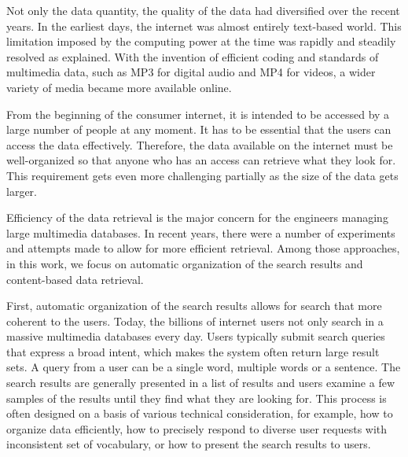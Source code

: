 Not only the data quantity, the quality of the data had diversified over the recent years. In the earliest days, the internet was almost entirely text-based world. This limitation imposed by the computing power at the time was rapidly and steadily resolved as explained. With the invention of efficient coding and standards of multimedia data, such as MP3 for digital audio and MP4 for videos, a wider variety of media became more available online.

From the beginning of the consumer internet, it is intended to be accessed by a large number of people at any moment. It has to be essential that the users can access the data effectively. Therefore, the data available on the internet must be well-organized so that anyone who has an access can retrieve what they look for. This requirement gets even more challenging partially as the size of the data gets larger.

Efficiency of the data retrieval is the major concern for the engineers managing large multimedia databases. In recent years, there were a number of experiments and attempts made to allow for more efficient retrieval. Among those approaches, in this work, we focus on automatic organization of the search results and content-based data retrieval.

First, automatic organization of the search results allows for search that more coherent to the users. Today, the billions of internet users not only search in a massive multimedia databases every day. 
Users typically submit search queries that express a broad intent, which makes the system often return large result sets. A query from a user can be a single word, multiple words or a sentence. The search results are generally presented in a list of results and users examine a few samples of the results until they find what they are looking for. This process is often designed on a basis of various technical consideration, for example, how to organize data efficiently, how to precisely respond to diverse user requests with inconsistent set of vocabulary, or how to present the search results to users.


\newpage


